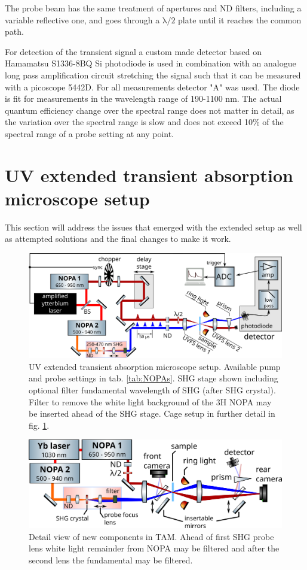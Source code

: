 \documentclass[twoside,openright]{scrreprt}
\begin{document}
The probe beam has the same treatment of apertures and ND filters, including a variable reflective one, and goes through a $\mathrm{\lambda/2}$ plate until it reaches the common path.


For detection of the transient signal a custom made detector based on Hamamatsu S1336-8BQ Si photodiode is used in combination with an analogue long pass amplification circuit stretching the signal such that it can be measured with a picoscope 5442D. For all measurements detector "A" was used. The diode is fit for measurements in the wavelength range of 190-1100 nm. The actual quantum efficiency change over the spectral range does not matter in detail, as the variation over the spectral range is slow and does not exceed 10\% of the spectral range of a probe setting at any point.

\section{UV extended transient absorption microscope setup}
This section will address the issues that emerged with the extended setup as well as attempted solutions and the final changes to make it work.

\begin{figure}[h]
\centering
\includegraphics[width=0.9\linewidth]{images/ComponentLibrary_svg/experimental_tam_shg_swapped.png}
\caption{UV extended transient absorption microscope setup. Available pump and probe settings in tab. \ref{tab:NOPAs}.
SHG stage shown including optional filter fundamental wavelength of SHG (after SHG crystal). Filter to remove the white light background of the 3H NOPA may be inserted ahead of the SHG stage. Cage setup in further detail in fig. \ref{fig:CageSetup}.}
\end{figure}

\begin{figure}[h]
\centering
\includegraphics[width=0.9\linewidth]{images/ComponentLibrary_svg/SHG-focusing-large.png}
\caption{Detail view of new components in TAM. Ahead of first SHG probe lens white light remainder from NOPA may be filtered and after the second lens the fundamental may be filtered.\label{fig:CageSetup}}
\end{figure}
\end{document}
